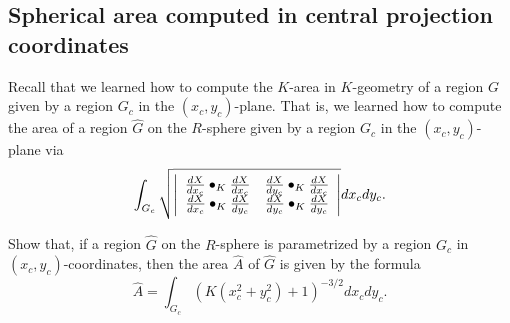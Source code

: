 \documentclass{ximera}
\begin{document}
\subsection*{Spherical area computed in central projection coordinates}

Recall that %
we learned how to compute the $K$-area in
$K$-geometry of a region $G$ given by a region $G_{c}$ in the $\left(
x_{c},y_{c}\right)  $-plane. That is, we learned how to compute the area of a
region $\hat{G}$ on the $R$-sphere given by a region $G_{c}$ in the $\left(
x_{c},y_{c}\right)  $-plane via
\[
\int\nolimits_{G_{c}}
\sqrt{\left\vert
\begin{array}
[c]{cc}%
\frac{dX}{dx_{c}}\bullet_{K}\frac{dX}{dx_{c}} & \frac{dX}{dy_{c}}\bullet
_{K}\frac{dX}{dx_{c}}\\
\frac{dX}{dx_{c}}\bullet_{K}\frac{dX}{dy_{c}} & \frac{dX}{dy_{c}}\bullet
_{K}\frac{dX}{dy_{c}}%
\end{array}
\right\vert }dx_{c}dy_{c}.
\]

\begin{exercise}
Show that, if a region $\hat{G}$ on the $R$-sphere is
parametrized by a region $G_{c}$ in $\left(  x_{c},y_{c}\right)
$-coordinates, then the area $\hat{A}$ of $\hat{G}$ is given by the formula%
\[
\hat{A}=%
{\displaystyle\int\nolimits_{G_{c}}}
\left(  K\left(  x_{c}^{2}+y_{c}^{2}\right)  +1\right)  ^{-3/2}dx_{c}dy_{c}.
\]

\end{exercise}
\end{document}
